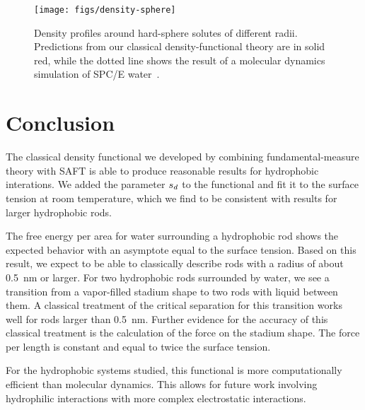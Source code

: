 \documentclass[letterpaper,twocolumn,amsmath,amssymb,prb]{revtex4-1}
\begin{document}
\begin{figure}
\begin{center}
\texttt{[image: figs/density-sphere]}
\end{center}
\caption{ Density profiles around hard-sphere solutes of different radii. Predictions
  from our classical density-functional theory are in solid red, while
  the dotted line shows the result of a molecular dynamics simulation
  of SPC/E water~\cite{huang2001shs}.  }
\label{fig:density-sphere}
\end{figure}

\section{Conclusion}

The classical density functional we developed by combining fundamental-measure 
theory with SAFT is able to produce reasonable results for hydrophobic interations.
We added the parameter $s_d$ to the functional and fit it to the surface tension
at room temperature, which we find to be consistent with results for larger hydrophobic
rods. 

The free energy per area for water surrounding a hydrophobic rod shows the
expected behavior with an asymptote equal to the surface tension.
Based on this result, we expect to be
able to classically describe rods with a radius of about 0.5~nm or larger. 
For two hydrophobic rods surrounded by water, we see a transition from a vapor-filled
stadium shape to two rods with liquid between them. A
classical treatment of the critical separation for this transition
works well for rods larger than 0.5~nm. Further evidence for the
accuracy of this classical treatment is the calculation of the force on the
stadium shape. The force per length is constant and equal to twice the surface tension.

For the hydrophobic systems studied, this functional is more computationally 
efficient than molecular dynamics. This allows for future work
involving hydrophilic interactions with more complex electrostatic interactions.


\end{document}
